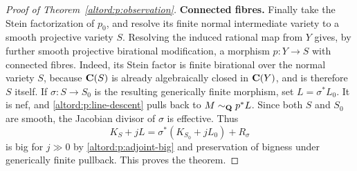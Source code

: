 \begin{proof}[Proof of Theorem~\ref{altord:p:observation}]
\medskip\noindent
\textbf{Connected fibres.}
Finally take the Stein factorization of $p_0$, and resolve its finite
normal intermediate variety to a smooth projective variety $S$.
Resolving the induced rational map from $Y$ gives, by further smooth
projective birational modification, a morphism $p:Y\to S$ with
connected fibres. Indeed, its Stein factor is finite birational over
the normal variety $S$, because $\mathbf C(S)$ is already algebraically closed
in $\mathbf C(Y)$, and is therefore $S$ itself.
If $\sigma:S\to S_0$ is the resulting generically
finite morphism, set $L=\sigma^*L_0$.  It is nef, and
\eqref{altord:p:line-descent} pulls back to $M\sim_{\mathbf Q}p^*L$.
Since both $S$ and $S_0$ are smooth, the Jacobian divisor of $\sigma$
is effective.  Thus
\[
  K_S+jL
  =\sigma^*(K_{S_0}+jL_0)+R_\sigma
\]
is big for $j\gg0$ by \eqref{altord:p:adjoint-big} and preservation of
bigness under generically finite pullback.  This proves the theorem.
\end{proof}
